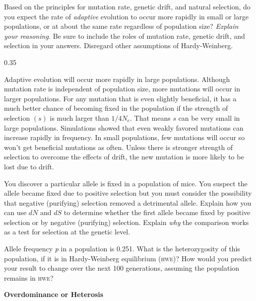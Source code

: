 \question[10]
Based on the principles for mutation rate, genetic drift, and natural selection, do you expect the rate of \emph{adaptive} evolution to occur more rapidly in small or large populations, or at about the same rate regardless of population size? \emph{Explain your reasoning.} Be sure to include the roles of mutation rate, genetic drift, and selection in your answers. Disregard other assumptions of Hardy-Weinberg.

\begin{AnswerPage}{0.35\textheight}
	
Adaptive evolution will occur more rapidly in large populations. Although mutation rate is independent of population size, more mutations will occur in larger populations. For any mutation that is even slightly beneficial, it has a much better chance of becoming fixed in the population if the strength of selection $(s)$ is much larger than $1/4N_e$. That means $s$ can be very small in large populations. Simulations showed that even weakly favored mutations can increase rapidly in frequency.  In small populations, few mutations will occur so won't get beneficial mutations as often. Unless there is stronger strength of selection to overcome the effects of drift, the new mutation is more likely to be lost due to drift.
	
\end{AnswerPage}


\question[10]
You discover a particular allele is fixed in a population of mice. You suspect the allele became fixed due to positive selection but you must consider the possibility that negative (purifying) selection removed a detrimental allele. Explain how you can use $dN$ and $dS$ to determine whether the first allele became fixed by positive selection or by negative (purifying) selection. Explain \emph{why} the comparison works as a test for selection at the genetic level.


\question[5]
Allele frequency \textit{p} in a population is 0.251. What is the heterozygosity of this population, if it is in Hardy-Weinberg equilibrium (\textsc{hwe})? How would you predict your result to change over the next 100 generations, assuming the population remains in \textsc{hwe}?



\ifprintanswers\quad\textbf{Overdominance or Heterosis}\fi{}

